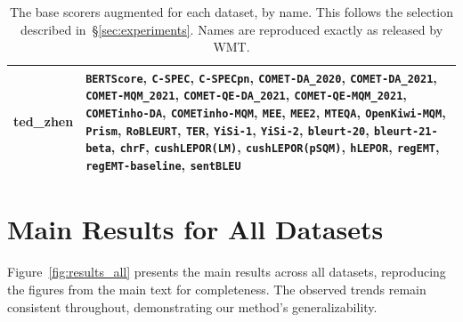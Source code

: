 \documentclass[11pt]{article}
\begin{document}
\begin{table}[t]
\begin{tabular}{l p{}}
ted\_zhen & \texttt{BERTScore}, \texttt{C-SPEC}, \texttt{C-SPECpn}, \texttt{COMET-DA\_2020}, \texttt{COMET-DA\_2021}, \texttt{COMET-MQM\_2021}, \texttt{COMET-QE-DA\_2021}, \texttt{COMET-QE-MQM\_2021}, \texttt{COMETinho-DA}, \texttt{COMETinho-MQM}, \texttt{MEE}, \texttt{MEE2}, \texttt{MTEQA}, \texttt{OpenKiwi-MQM}, \texttt{Prism}, \texttt{RoBLEURT}, \texttt{TER}, \texttt{YiSi-1}, \texttt{YiSi-2}, \texttt{bleurt-20}, \texttt{bleurt-21-beta}, \texttt{chrF}, \texttt{cushLEPOR(LM)}, \texttt{cushLEPOR(pSQM)}, \texttt{hLEPOR}, \texttt{regEMT}, \texttt{regEMT-baseline}, \texttt{sentBLEU} \\
\bottomrule
\end{tabular}
\caption{The base scorers augmented for each dataset, by name. This follows the selection described in~\S\ref{sec:experiments}. Names are reproduced exactly as released by WMT.}
\label{tab:dataset-scorers}
\end{table}

\section{Main Results for All Datasets}
\label{app:all_datasets}

Figure~\ref{fig:results_all} presents the main results across all datasets, reproducing the figures from the main text for completeness. The observed trends remain consistent throughout, demonstrating our method's generalizability.
\end{document}

